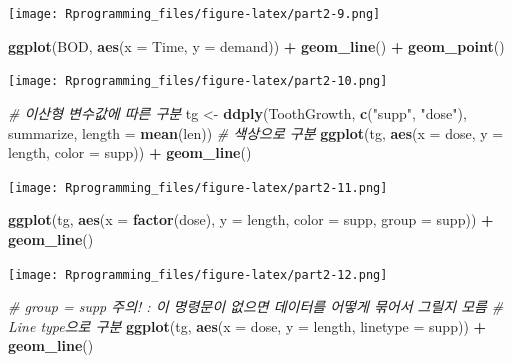 \documentclass[10pt,]{krantz}
\makeatletter
\newenvironment{Shaded}{\begin{snugshade}}{\end{snugshade}}
\newcommand{\KeywordTok}[1]{\textcolor[rgb]{0.13,0.29,0.53}{\textbf{#1}}}
\newcommand{\DataTypeTok}[1]{\textcolor[rgb]{0.13,0.29,0.53}{#1}}
\newcommand{\StringTok}[1]{\textcolor[rgb]{0.31,0.60,0.02}{#1}}
\newcommand{\CommentTok}[1]{\textcolor[rgb]{0.56,0.35,0.01}{\textit{#1}}}
\newcommand{\OperatorTok}[1]{\textcolor[rgb]{0.81,0.36,0.00}{\textbf{#1}}}
\newcommand{\NormalTok}[1]{#1}
\newenvironment{kframe}{%
\medskip{}
\setlength{\fboxsep}{.8em}
 \def\at@end@of@kframe{}%
 \ifinner\ifhmode%
  \def\at@end@of@kframe{\end{minipage}}%
  \begin{minipage}{\columnwidth}%
 \fi\fi%
 \def\FrameCommand##1{\hskip\@totalleftmargin \hskip-\fboxsep
 \colorbox{shadecolor}{##1}\hskip-\fboxsep
     \hskip-\linewidth \hskip-\@totalleftmargin \hskip\columnwidth}%
 \MakeFramed {\advance\hsize-\width
   \@totalleftmargin\z@ \linewidth\hsize
   \@setminipage}}%
 {\par\unskip\endMakeFramed%
 \at@end@of@kframe}
\renewenvironment{Shaded}{\begin{kframe}}{\end{kframe}}
\theoremstyle{definition}
\theoremstyle{definition}
\theoremstyle{remark}
\makeatother
\begin{document}
\texttt{[image: Rprogramming\_files/figure-latex/part2-9.png]}

\begin{Shaded}
\begin{Highlighting}[]


\KeywordTok{ggplot}\NormalTok{(BOD, }\KeywordTok{aes}\NormalTok{(}\DataTypeTok{x =}\NormalTok{ Time, }\DataTypeTok{y =}\NormalTok{ demand)) }\OperatorTok{+}\StringTok{ }\KeywordTok{geom_line}\NormalTok{() }\OperatorTok{+}\StringTok{ }\KeywordTok{geom_point}\NormalTok{()}
\end{Highlighting}
\end{Shaded}

\texttt{[image: Rprogramming\_files/figure-latex/part2-10.png]}

\begin{Shaded}
\begin{Highlighting}[]


\CommentTok{# 이산형 변수값에 따른 구분 }
\NormalTok{tg <-}\StringTok{ }\KeywordTok{ddply}\NormalTok{(ToothGrowth, }\KeywordTok{c}\NormalTok{(}\StringTok{"supp"}\NormalTok{, }\StringTok{"dose"}\NormalTok{), summarize, }\DataTypeTok{length =} \KeywordTok{mean}\NormalTok{(len))}
\CommentTok{# 색상으로 구분}
\KeywordTok{ggplot}\NormalTok{(tg, }\KeywordTok{aes}\NormalTok{(}\DataTypeTok{x =}\NormalTok{ dose, }\DataTypeTok{y =}\NormalTok{ length, }\DataTypeTok{color =}\NormalTok{ supp)) }\OperatorTok{+}\StringTok{ }\KeywordTok{geom_line}\NormalTok{()}
\end{Highlighting}
\end{Shaded}

\texttt{[image: Rprogramming\_files/figure-latex/part2-11.png]}

\begin{Shaded}
\begin{Highlighting}[]


\KeywordTok{ggplot}\NormalTok{(tg, }\KeywordTok{aes}\NormalTok{(}\DataTypeTok{x =} \KeywordTok{factor}\NormalTok{(dose), }\DataTypeTok{y =}\NormalTok{ length, }\DataTypeTok{color =}\NormalTok{ supp, }\DataTypeTok{group =}\NormalTok{ supp)) }\OperatorTok{+}\StringTok{ }\KeywordTok{geom_line}\NormalTok{()}
\end{Highlighting}
\end{Shaded}

\texttt{[image: Rprogramming\_files/figure-latex/part2-12.png]}

\begin{Shaded}
\begin{Highlighting}[]


\CommentTok{# group = supp 주의! : 이 명령문이 없으면 데이터를 어떻게 묶어서 그릴지 모름}
\CommentTok{# Line type으로 구분}
\KeywordTok{ggplot}\NormalTok{(tg, }\KeywordTok{aes}\NormalTok{(}\DataTypeTok{x =}\NormalTok{ dose, }\DataTypeTok{y =}\NormalTok{ length, }\DataTypeTok{linetype =}\NormalTok{ supp)) }\OperatorTok{+}\StringTok{ }\KeywordTok{geom_line}\NormalTok{()}
\end{Highlighting}
\end{Shaded}
\end{document}
